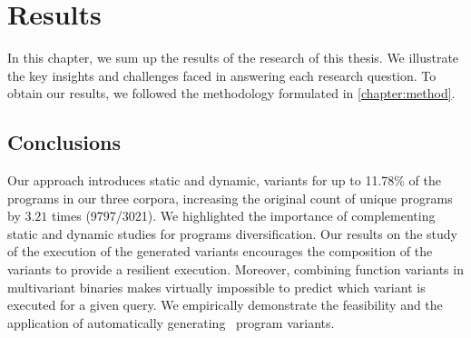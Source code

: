 \chapter{Results} 
\label{chapter:results}

In this chapter, we sum up the results of the research of this thesis. We illustrate the key insights and challenges faced in answering each research question. To obtain our results, we followed the methodology formulated in \autoref{chapter:method}.







\section*{Conclusions}

Our approach introduces static and dynamic, variants for up to 11.78\% of the programs in our three corpora, increasing the original count of unique programs by $3.21$ times (9797/3021). We highlighted the importance of complementing static and dynamic studies for programs diversification. 
Our results on the study of the execution of the generated variants encourages the composition of the variants to provide a resilient execution.
Moreover, combining function variants in multivariant binaries makes virtually impossible to predict which variant is executed for a given query. We empirically demonstrate the feasibility and the application of automatically generating \wasm\ program variants.

